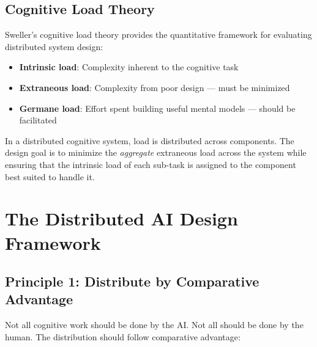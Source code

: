 \documentclass[11pt,a4paper]{article}
\begin{document}
\subsection{Cognitive Load Theory}

Sweller's \citep{sweller1988} cognitive load theory provides the quantitative framework for evaluating distributed system design:
\begin{itemize}[leftmargin=*, itemsep=2pt]
  \item \textbf{Intrinsic load}: Complexity inherent to the cognitive task
  \item \textbf{Extraneous load}: Complexity from poor design --- must be minimized
  \item \textbf{Germane load}: Effort spent building useful mental models --- should be facilitated
\end{itemize}

In a distributed cognitive system, load is distributed across components. The design goal is to minimize the \emph{aggregate} extraneous load across the system while ensuring that the intrinsic load of each sub-task is assigned to the component best suited to handle it.

\section{The Distributed AI Design Framework}

\subsection{Principle 1: Distribute by Comparative Advantage}

Not all cognitive work should be done by the AI. Not all should be done by the human. The distribution should follow comparative advantage:
\end{document}

